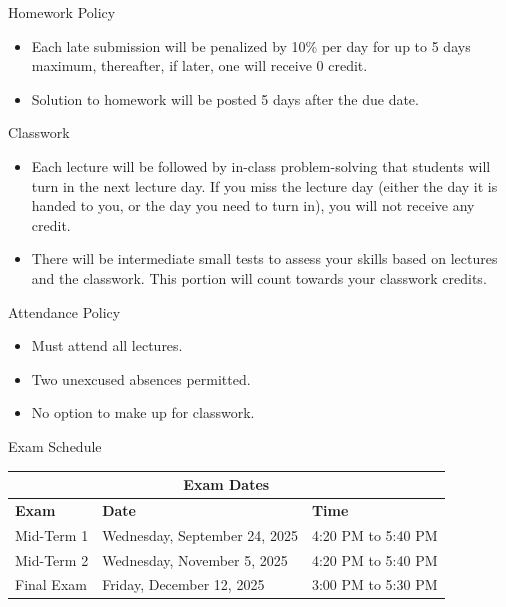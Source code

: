 \documentclass[aspectratio=169,xcolor=dvipsnames,svgnames,x11names,fleqn]{beamer}
\begin{document}
\begin{frame}{Homework Policy}
\begin{itemize}
\item Each late submission will be penalized by 10\% per day for up to 5 days maximum, thereafter, if later, one will receive 0 credit. 
\item Solution to homework will be posted 5 days after the due date.
\end{itemize}

\end{frame}

\begin{frame}{Classwork}

\begin{itemize}
\item Each lecture will be followed by in-class problem-solving that students will turn in the next lecture day. If you miss the lecture day (either the day it is handed to you, or the day you need to turn in), you will not receive any credit.

\item There will be intermediate small tests to assess your skills based on lectures and the classwork. This portion will count towards your classwork credits.
\end{itemize}



\end{frame}

\begin{frame}{Attendance Policy}

\begin{itemize}
\item Must attend all lectures.
\item Two unexcused absences permitted.
\item No option to make up for classwork.
\end{itemize}

\end{frame}

\begin{frame}{Exam Schedule}
\begin{tabular}{|p{3cm}|p{5cm}|p{5cm}|}
\hline
\multicolumn{3}{|c|}{\textbf{Exam Dates}} \\ \hline
\textbf{Exam} & \textbf{Date} & \textbf{Time} \\ \hline
Mid-Term 1 & Wednesday, September 24, 2025 & 4:20 PM to 5:40 PM\\ \hline
Mid-Term 2 & Wednesday, November 5, 2025 & 4:20 PM to 5:40 PM\\ \hline
Final Exam & Friday, December 12, 2025 & 3:00 PM to 5:30 PM\\ \hline
\end{tabular}
\end{frame}
\end{document}
